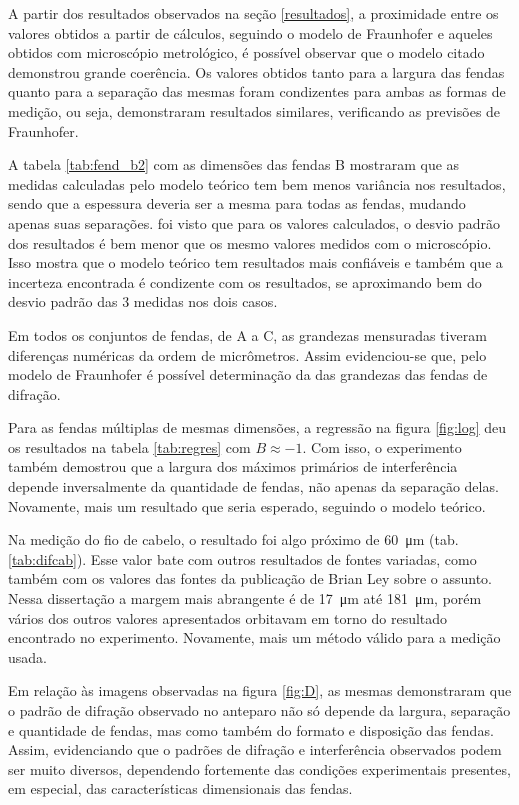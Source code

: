 A partir dos resultados observados na seção \ref{resultados}, a proximidade entre os valores obtidos a partir de cálculos, seguindo o modelo de Fraunhofer e aqueles obtidos com microscópio metrológico, é possível observar que o modelo citado demonstrou grande coerência. Os valores obtidos tanto para a largura das fendas quanto para a separação das mesmas foram condizentes para ambas as formas de medição, ou seja, demonstraram resultados similares, verificando as previsões de Fraunhofer.

A tabela \ref{tab:fend_b2} com as dimensões das fendas B mostraram que as medidas calculadas pelo modelo teórico tem bem menos variância nos resultados, sendo que a espessura deveria ser a mesma para todas as fendas, mudando apenas suas separações. foi visto que para os valores calculados, o desvio padrão dos resultados é bem menor que os mesmo valores medidos com o microscópio. Isso mostra que o modelo teórico tem resultados mais confiáveis e também que a incerteza encontrada é condizente com os resultados, se aproximando bem do desvio padrão das 3 medidas nos dois casos.

Em todos os conjuntos de fendas, de A a C, as grandezas mensuradas tiveram diferenças numéricas da ordem de micrômetros. Assim evidenciou-se que, pelo modelo de Fraunhofer é possível determinação da das grandezas das fendas de difração.

Para as fendas múltiplas de mesmas dimensões, a regressão na figura \ref{fig:log} deu os resultados na tabela \ref{tab:regres} com $B \approx -1$. Com isso, o experimento também demostrou que a largura dos máximos primários de interferência depende inversalmente da quantidade de fendas, não apenas da separação delas. Novamente, mais um resultado que seria esperado, seguindo o modelo teórico.

Na medição do fio de cabelo, o resultado foi algo próximo de \SI{60}{\micro\meter} (tab. \ref{tab:difcab}). Esse valor bate com outros resultados de fontes variadas, como também com os valores das fontes da publicação\cite{ref:cabelo} de Brian Ley sobre o assunto. Nessa dissertação a margem mais abrangente é de \SI{17}{\micro\meter} até \SI{181}{\micro\meter}, porém vários dos outros valores apresentados orbitavam em torno do resultado encontrado no experimento. Novamente, mais um método válido para a medição usada.

Em relação às imagens observadas na figura \ref{fig:D}, as mesmas demonstraram que o padrão de difração observado no anteparo não só depende da largura, separação e quantidade de fendas, mas como também do formato e disposição das fendas. Assim, evidenciando que o padrões de difração e interferência observados podem ser muito diversos, dependendo fortemente das condições experimentais presentes, em especial, das características dimensionais das fendas.
